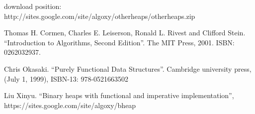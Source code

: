\documentclass{article}
\begin{document}
download position: http://sites.google.com/site/algoxy/otherheaps/otherheaps.zip

\begin{thebibliography}{99}

Thomas H. Cormen, Charles E. Leiserson, Ronald L. Rivest and Clifford Stein. ``Introduction to Algorithms, Second Edition''. The MIT Press, 2001. ISBN: 0262032937.

Chris Okasaki. ``Purely Functional Data Structures''. Cambridge university press, (July 1, 1999), ISBN-13: 978-0521663502

Liu Xinyu. ``Binary heaps with functional and imperative implementation'', https://sites.google.com/site/algoxy/bheap

\end{thebibliography}

\ifx\wholebook\relax \else
\end{document}
